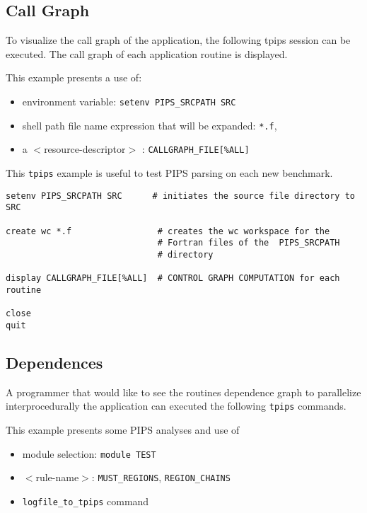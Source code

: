 \documentclass[a4paper,12pt]{article}
\begin{document}
\subsection{Call Graph}
\label{exm1}

To visualize the  call graph of the application, the following tpips
session can be executed. The call graph of each application routine is
displayed.

This example presents a use of:

\begin{itemize}
\item environment variable: \verb+setenv PIPS_SRCPATH SRC+
\item shell path file name expression that will be expanded: \verb+*.f+,
\item a $<$resource-descriptor$>$ : \verb+CALLGRAPH_FILE[%ALL]+
\end{itemize}
This \texttt{tpips} example is useful to test PIPS parsing on each new
benchmark.

\begin{verbatim}
setenv PIPS_SRCPATH SRC      # initiates the source file directory to SRC

create wc *.f                 # creates the wc workspace for the
                              # Fortran files of the  PIPS_SRCPATH 
                              # directory

display CALLGRAPH_FILE[%ALL]  # CONTROL GRAPH COMPUTATION for each routine

close 
quit

\end{verbatim}


\subsection{Dependences}
\label{exm2}

A programmer that would like to see the routines dependence graph to
parallelize interprocedurally the application can executed the following
\texttt{tpips} commands.

This example presents some PIPS analyses and use of
\begin{itemize}
\item module selection: \verb+module TEST+
\item $<$rule-name$>$: \verb+MUST_REGIONS+, \verb+REGION_CHAINS+
\item \verb+logfile_to_tpips+ command
\end{itemize}
\end{document}
